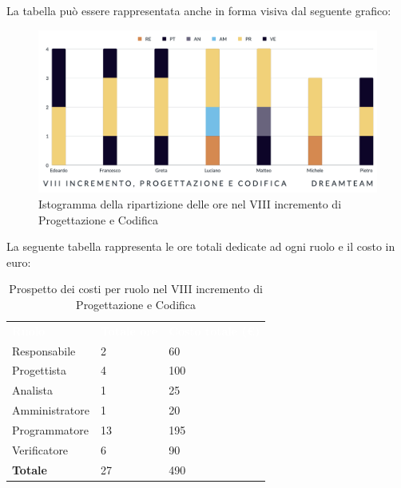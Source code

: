 La tabella può essere rappresentata anche in forma visiva dal seguente grafico:
\begin{figure}[H]
\centering
\includegraphics[scale=0.55]{Sezioni/SezioniPreventivo/grafici/Preventivo_progettazione_VIII.png}
\caption{Istogramma della ripartizione delle ore nel VIII incremento di Progettazione e Codifica}
\end{figure}

La seguente tabella rappresenta le ore totali dedicate ad ogni ruolo e il costo in euro:

\begin{table}[H]
\begin{center}
\renewcommand{\arraystretch}{1.5}
\begin{tabular}{ m{}<{\centering}  m{}<{\centering} m{}<{\centering}}
	\rowcolor{darkblue}
	\textcolor{white}{\textbf{Ruolo}}&\textcolor{white}{\textbf{Totale ore}}&\textcolor{white}{\textbf{Costo totale (\euro)}}\\ 

	Responsabile  & 2 & 60 \\	
	
	Progettista & 4 & 100 \\
	
	Analista & 1 & 25 \\

	Amministratore & 1 & 20 \\
	
	Programmatore & 13 & 195 \\
	
	Verificatore & 6 & 90 \\
	
	\textbf{Totale} & 27 & 490 \\
	
\end{tabular}
\caption{Prospetto dei costi per ruolo nel VIII incremento di Progettazione e Codifica}
\end{center}
\end{table}

